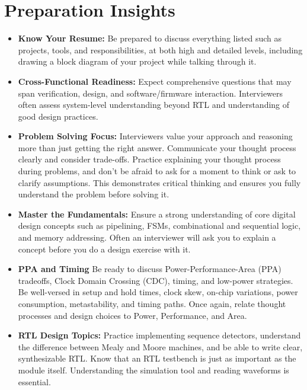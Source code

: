 \documentclass[11pt]{article}
\begin{document}
\section{Preparation Insights}
\begin{itemize}
    \item \textbf{Know Your Resume:} Be prepared to discuss everything
    listed such as projects, tools, and responsibilities, at both high and detailed
    levels, including drawing a block diagram of your project while talking
    through it.

    \item \textbf{Cross-Functional Readiness:} Expect comprehensive questions
    that may span verification, design, and software/firmware interaction.
    Interviewers often assess system-level understanding beyond RTL and
    understanding of good design practices.

    \item \textbf{Problem Solving Focus:} Interviewers value your approach and
    reasoning more than just getting the right answer. Communicate your thought
    process clearly and consider trade-offs. Practice explaining your thought
    process during problems, and don't be afraid to ask for a moment to think
    or ask to clarify assumptions. This demonstrates critical thinking and
    ensures you fully understand the problem before solving it.

    \item \textbf{Master the Fundamentals:} Ensure a strong understanding of
    core digital design concepts such as pipelining, FSMs, combinational and
    sequential logic, and memory addressing. Often an interviewer will ask you
    to explain a concept before you do a design exercise with it.

    \item \textbf{PPA and Timing} Be ready to discuss Power-Performance-Area
    (PPA) tradeoffs, Clock Domain Crossing (CDC), timing, and low-power
    strategies. Be well-versed in setup and hold times, clock skew, on-chip
    variations, power consumption, metastability, and timing paths. Once again,
    relate thought processes and design choices to Power, Performance, and
    Area.

    \item \textbf{RTL Design Topics:} Practice implementing sequence detectors,
    understand the difference between Mealy and Moore machines, and be able to
    write clear, synthesizable RTL. Know that an RTL testbench is just as
    important as the module itself. Understanding the simulation tool and
    reading waveforms is essential.


\end{itemize}
\end{document}
